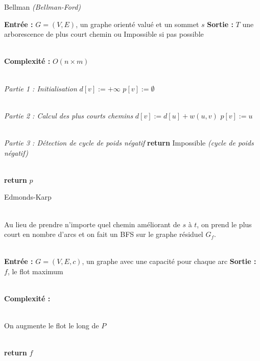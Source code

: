 \documentclass{article}      %
\begin{document}
\begin{algorithm} \caption{Bellman \textit{(Bellman-Ford)}}
\begin{algorithmic}

\State \textbf{Entrée :} $G = (V, E)$, un graphe orienté valué et un sommet $s$
\State \textbf{Sortie :} $T$ une arborescence de plus court chemin ou Impossible si pas possible

\\ \State \textbf{Complexité :} $O(n\times m)$

\\ \State \textit{Partie 1 : Initialisation}
    \State $d[v] := +\infty$
    \State $p[v] := \emptyset$
\EndFor


\\ \State \textit{Partie 2 : Calcul des plus courts chemins}
            \State $d[v] := d[u] + w(u, v)$
            \State $p[v] := u$
        \EndIf
    \EndFor
\EndFor


\\ \State \textit{Partie 3 : Détection de cycle de poids négatif}
    \State \textbf{return} Impossible \textit{(cycle de poids négatif)}
    \EndIf
\EndFor

\\ \State \textbf{return} $p$
\end{algorithmic}
\end{algorithm}


\begin{algorithm} \caption{Edmonds-Karp}
\begin{algorithmic}

\\ \State Au lieu de prendre n’importe quel chemin améliorant de $s$ à $t$, on prend le plus court en nombre d’arcs et on fait un BFS sur le graphe résiduel $G_f$.

\\ \State \textbf{Entrée :} $G = (V, E, c)$, un graphe avec une capacité pour chaque arc
\State \textbf{Sortie :} $f$, le flot maximum

\\ \State \textbf{Complexité :} %

\\ 
    \State On augmente le flot le long de $P$
\EndWhile

\\ \State \textbf{return} $f$
\end{algorithmic}
\end{algorithm}
\end{document}
